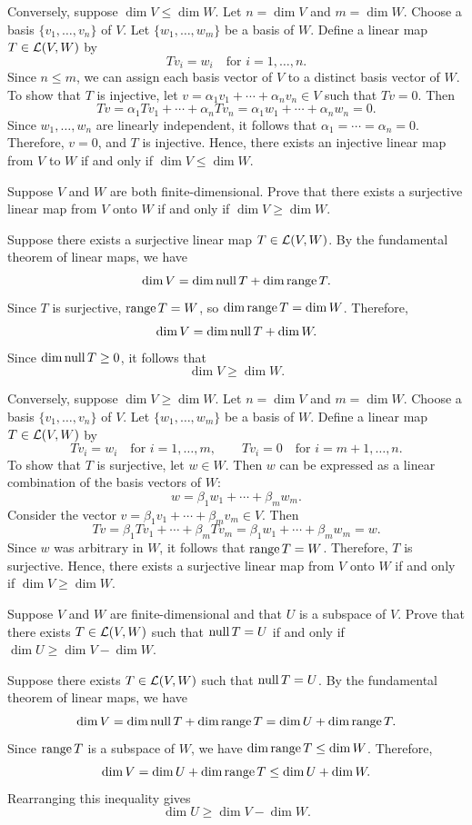 \begin{exc}
\begin{solution}
Conversely, suppose $\dim V\le\dim W$. Let $n=\dim V$ and $m=\dim W$. Choose
a basis $\{v_1,\dots,v_n\}$ of $V$. Let $\{w_1,\dots,w_m\}$ be a basis of $W$.
Define a linear map $T\in\mathcal{L}(V,W)$ by
\[ Tv_i=w_i \quad\text{for } i=1,\dots,n. \]
Since $n\le m$, we can assign each basis vector of $V$ to a distinct basis
vector of $W$. To show that $T$ is injective, let
$v=\alpha_1v_1+\cdots+\alpha_nv_n\in V$ such that $Tv=0$. Then
\[ Tv=\alpha_1Tv_1+\cdots+\alpha_nTv_n=\alpha_1w_1+\cdots+\alpha_nw_n=0. \]
Since $w_1,\dots,w_n$ are linearly independent, it follows that
$\alpha_1=\cdots=\alpha_n=0$. Therefore, $v=0$, and $T$ is injective. Hence,
there exists an injective linear map from $V$ to $W$ if and only if
$\dim V\le\dim W$.
\end{solution}

\begin{exercise}
Suppose $V$ and $W$ are both finite-dimensional. Prove that there exists a
surjective linear map from $V$ onto $W$ if and only if $\dim V\ge\dim W$.
\end{exercise}
\begin{solution}
Suppose there exists a surjective linear map $T\in\mathcal{L}(V,W)$. By the
fundamental theorem of linear maps, we have
\[ \operatorname{dim} V=\operatorname{dim}\operatorname{null} T+\operatorname{dim}\operatorname{range} T. \]
Since $T$ is surjective, $\operatorname{range} T=W$, so $\operatorname{dim}\operatorname{range} T=\operatorname{dim} W$. Therefore,
\[ \operatorname{dim} V=\operatorname{dim}\operatorname{null} T+\operatorname{dim} W. \]
Since $\operatorname{dim}\operatorname{null} T\ge0$, it follows that
\[ \dim V\ge\dim W. \]

Conversely, suppose $\dim V\ge\dim W$. Let $n=\dim V$ and $m=\dim W$. Choose
a basis $\{v_1,\dots,v_n\}$ of $V$. Let $\{w_1,\dots,w_m\}$ be a basis of $W$.
Define a linear map $T\in\mathcal{L}(V,W)$ by
\[ Tv_i=w_i \quad\text{for } i=1,\dots,m, \qquad
   Tv_i=0 \quad\text{for } i=m+1,\dots,n. \]
To show that $T$ is surjective, let $w\in W$. Then $w$ can be expressed as a
linear combination of the basis vectors of $W$:
\[ w=\beta_1w_1+\cdots+\beta_mw_m. \]
Consider the vector $v=\beta_1v_1+\cdots+\beta_mv_m\in V$. Then
\[ Tv=\beta_1Tv_1+\cdots+\beta_mTv_m=\beta_1w_1+\cdots+\beta_mw_m=w. \]
Since $w$ was arbitrary in $W$, it follows that $\operatorname{range} T=W$. Therefore, $T$
is surjective. Hence, there exists a surjective linear map from $V$ onto $W$
if and only if $\dim V\ge\dim W$.
\end{solution}

\begin{exercise}
Suppose $V$ and $W$ are finite-dimensional and that $U$ is a subspace of $V$.
Prove that there exists $T\in\mathcal{L}(V,W)$ such that $\operatorname{null} T=U$ if and only if
$\dim U\ge\dim V-\dim W$.
\end{exercise}
\begin{solution}
Suppose there exists $T\in\mathcal{L}(V,W)$ such that $\operatorname{null} T=U$. By the
fundamental theorem of linear maps, we have
\[ \operatorname{dim} V=\operatorname{dim}\operatorname{null} T+\operatorname{dim}\operatorname{range} T=\operatorname{dim} U+\operatorname{dim}\operatorname{range} T. \]
Since $\operatorname{range} T$ is a subspace of $W$, we have $\operatorname{dim}\operatorname{range} T\le\operatorname{dim} W$.
Therefore,
\[ \operatorname{dim} V=\operatorname{dim} U+\operatorname{dim}\operatorname{range} T\le\operatorname{dim} U+\operatorname{dim} W. \]
Rearranging this inequality gives
\[ \dim U\ge\dim V-\dim W. \]


\end{solution}
\end{exc}
